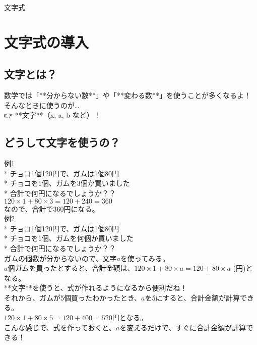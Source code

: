 ﻿\documentclass{jsarticle}
\begin{document}
{\LARGE \noindent 文字式}

\section{文字式の導入}


\subsection*{文字とは？}
数学では「**分からない数**」や「**変わる数**」を使うことが多くなるよ！\\

そんなときに使うのが…\\
👉 **文字**（x, a, b など）！


\subsection*{どうして文字を使うの？}

例1\\
* チョコ1個120円で、ガムは1個80円\\
* チョコを1個、ガムを3個か買いました\\
* 合計で何円になるでしょうか？？\\

$120 \times 1 + 80 \times 3 = 120 + 240 =360$\\
なので、合計で360円になる。\\

例2\\
* チョコ1個120円で、ガムは1個80円\\
* チョコを1個、ガムを何個か買いました\\
* 合計で何円になるでしょうか？？\\

ガムの個数が分からないので、文字$a$を使ってみる。\\
$a$個ガムを買ったとすると、合計金額は、$120 \times 1 + 80 \times a =120 + 80 \times a$ (円)となる。\\
**文字**を使うと、式が作れるようになるから便利だね！\\

それから、ガムが5個買ったわかったとき、$a$を5にすると、合計金額が計算できる。\\
$120 \times 1 + 80 \times 5 =120 + 400 = 520$円となる。\\

こんな感じで、式を作っておくと、$a$を変えるだけで、すぐに合計金額が計算できる！\\
\end{document}

